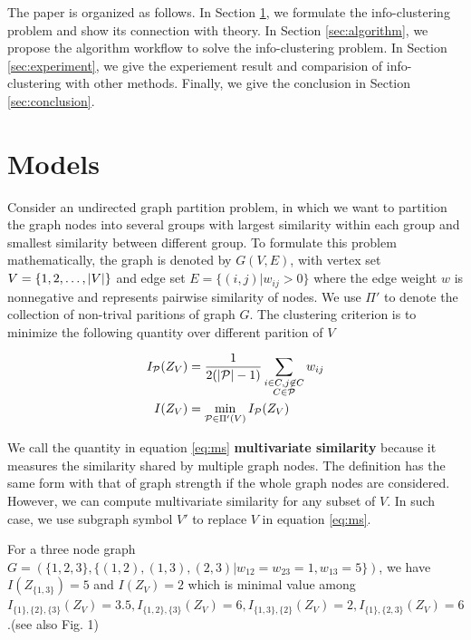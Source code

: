 \documentclass{article}
\begin{document}
The paper is organized as follows. In Section \ref{sec:models}, we formulate the info-clustering problem and show its connection with theory. In Section \ref{sec:algorithm}, we propose the algorithm workflow to solve the info-clustering problem. In Section \ref{sec:experiment}, we give the experiement result and comparision of info-clustering with other methods. Finally, we give the conclusion in Section \ref{sec:conclusion}.


\section{Models}\label{sec:models}

Consider an undirected graph partition problem, in which we want to partition the graph nodes into several groups with largest similarity within each group and smallest similarity between different group. To formulate this problem mathematically, the graph is denoted by $G(V,E)$, with vertex set $V = \{1, 2, \dots, \lvert V\rvert\}$ and edge set $E=\{(i,j) | w_{ij}>0\}$ where the edge weight $w$ is nonnegative and represents pairwise similarity of nodes. We use $\Pi'$ to denote the collection of non-trival paritions of graph $G$. The clustering criterion is to minimize the following quantity over different parition of $V$
\begin{definition}\label{def:ms}
\begin{align}
I_{\mathcal{P}}(Z_V) & = {1 \over 2 ( \lvert\mathcal{P}\rvert - 1) } \sum_{\substack{i\in C, j \not\in C\\ C\in \mathcal{P}}} w_{ij} \\
I(Z_V) & = \min_{\mathcal{P} \in \Pi'(V)} I_{\mathcal{P}}(Z_V)  \label{eq:ms}
\end{align}
\end{definition}

We call the quantity in equation \eqref{eq:ms} \textbf{multivariate similarity} because it measures the similarity shared by multiple graph nodes. The definition has the same form with that of graph strength if  the whole graph nodes are considered\cite{RN12}. However, we can compute multivariate similarity for any subset of $V$. In such case, 
we use subgraph symbol $V'$ to replace $V$ in equation \eqref{eq:ms}.
\begin{example}\label{eg:three}
For a three node graph $G=(\{1,2,3\},\{(1,2),(1,3),(2,3)| w_{12}=w_{23}=1, w_{13}=5\})$, we have $I(Z_{\{1,3\}}) = 5$ and $I(Z_V) = 2$ which is minimal value among $I_{\{1\},\{2\},\{3\}}(Z_V)=3.5, I_{\{1, 2\},\{3\}}(Z_V)=6, I_{\{1,3\},\{2\}}(Z_V)=2, I_{\{1\},\{2,3\}}(Z_V)=6$.(see also \cite{RN9} Fig. 1)
\end{example}
\end{document}

